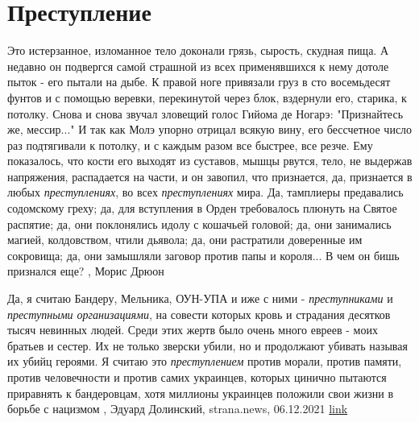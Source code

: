  
 
 
 
 
\chapter{Преступление}

Это истерзанное, изломанное тело доконали грязь, сырость, скудная пища. А
недавно он подвергся самой страшной из всех применявшихся к нему дотоле
пыток - его пытали на дыбе. К правой ноге привязали груз в сто восемьдесят
фунтов и с помощью веревки, перекинутой через блок, вздернули его, старика, к
потолку. Снова и снова звучал зловещий голос Гийома де Ногарэ: "Признайтесь
же, мессир..." И так как Молэ упорно отрицал всякую вину, его бессчетное
число раз подтягивали к потолку, и с каждым разом все быстрее, все резче. Ему
показалось, что кости его выходят из суставов, мышцы рвутся, тело, не
выдержав напряжения, распадается на части, и он завопил, что признается,
да, признается в любых \emph{преступлениях}, во всех \emph{преступлениях} мира. Да,
тамплиеры предавались содомскому греху; да, для вступления в Орден
требовалось плюнуть на Святое распятие; да, они поклонялись идолу с
кошачьей головой; да, они занимались магией, колдовством, чтили дьявола;
да, они растратили доверенные им сокровища; да, они замышляли заговор против
папы и короля... В чем он бишь признался еще?
, Морис Дрюон

Да, я считаю Бандеру, Мельника, ОУН-УПА и иже с ними - \emph{преступниками} и
\emph{преступными организациями}, на совести которых кровь и страдания десятков
тысяч невинных людей.  Среди этих жертв было очень много евреев - моих братьев
и сестер. Их не только зверски убили, но и продолжают убивать называя их убийц
героями.  Я считаю это \emph{преступлением} против морали, против памяти,
против человечности и против самих украинцев, которых цинично пытаются
приравнять к бандеровцам, хотя миллионы украинцев положили свои жизни в борьбе
с нацизмом
, 
Эдуард Долинский, strana.news, 06.12.2021
\href{https://strana.news/opinions/365623-za-neljubov-k-bandere-von-za-predely-ukrainy.html}{link}
